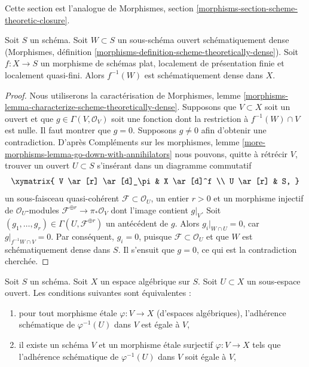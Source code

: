 \noindent
Cette section est l'analogue de
Morphismes, section \ref{morphisms-section-scheme-theoretic-closure}.

\begin{lemma}
\label{lemma-scheme-theoretically-dense-representable}
Soit $S$ un schéma. Soit $W \subset S$ un sous-schéma ouvert
schématiquement dense
(Morphismes, définition \ref{morphisms-definition-scheme-theoretically-dense}).
Soit $f : X \to S$ un morphisme de schémas plat, localement de
présentation finie et localement quasi-fini.
Alors $f^{-1}(W)$ est schématiquement dense dans $X$.
\end{lemma}

\begin{proof}
Nous utiliserons la caractérisation de Morphismes, lemme
\ref{morphisms-lemma-characterize-scheme-theoretically-dense}.
Supposons que $V \subset X$ soit un ouvert et que $g \in \Gamma(V, \mathcal{O}_V)$
soit une fonction dont la restriction à $f^{-1}(W) \cap V$ est nulle.
Il faut montrer que $g = 0$. Supposons $g \not = 0$ afin d'obtenir une
contradiction. D'après
Compléments sur les morphismes, lemme \ref{more-morphisms-lemma-go-down-with-annihilators}
nous pouvons, quitte à rétrécir $V$, trouver un ouvert $U \subset S$ s'insérant dans un
diagramme commutatif
$$
\xymatrix{
V \ar[r] \ar[d]_\pi & X \ar[d]^f \\
U \ar[r] & S,
}
$$
un sous-faisceau quasi-cohérent $\mathcal{F} \subset \mathcal{O}_U$, un entier
$r > 0$ et un morphisme injectif de $\mathcal{O}_U$-modules
$\mathcal{F}^{\oplus r} \to \pi_*\mathcal{O}_V$
dont l'image contient $g|_V$. Soit
$(g_1, \ldots, g_r) \in \Gamma(U, \mathcal{F}^{\oplus r})$ un antécédent de $g$.
Alors $g_i|_{W \cap U} = 0$, car $g|_{f^{-1}W \cap V} = 0$.
Par conséquent, $g_i = 0$, puisque $\mathcal{F} \subset \mathcal{O}_U$ et que
$W$ est schématiquement dense dans $S$.
Il s'ensuit que $g = 0$, ce qui est la contradiction cherchée.
\end{proof}

\begin{lemma}
\label{lemma-scheme-theoretically-dense}
Soit $S$ un schéma.
Soit $X$ un espace algébrique sur $S$.
Soit $U \subset X$ un sous-espace ouvert.
Les conditions suivantes sont équivalentes :
\begin{enumerate}
\item pour tout morphisme étale $\varphi : V \to X$ (d'espaces algébriques),
l'adhérence schématique de $\varphi^{-1}(U)$ dans $V$ est égale à $V$,
\item il existe un schéma $V$ et un morphisme étale surjectif
$\varphi : V \to X$ tels que l'adhérence schématique de
$\varphi^{-1}(U)$ dans $V$ soit égale à $V$,
\end{enumerate}
\end{lemma}

